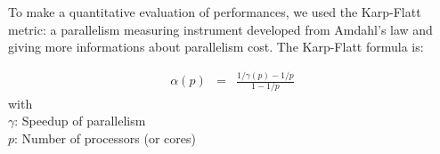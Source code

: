 \documentclass[smallextended]{svjour3}
\begin{document}
To make a quantitative evaluation of performances, we used the Karp-Flatt metric: a parallelism measuring instrument developed from Amdahl's law and giving more informations about parallelism cost. The Karp-Flatt formula is:

\begin{eqnarray}
\alpha(p) &=&\frac{1/\gamma(p) - 1/p}{1-1/p} \label{KarpFlatt}
\end{eqnarray}
with\\
$\gamma$: Speedup of parallelism\\
$p$: Number of processors (or cores)\\

\begin{figure}[h!]
	\centering
	\hspace{1cm}
\end{figure}
\end{document}
